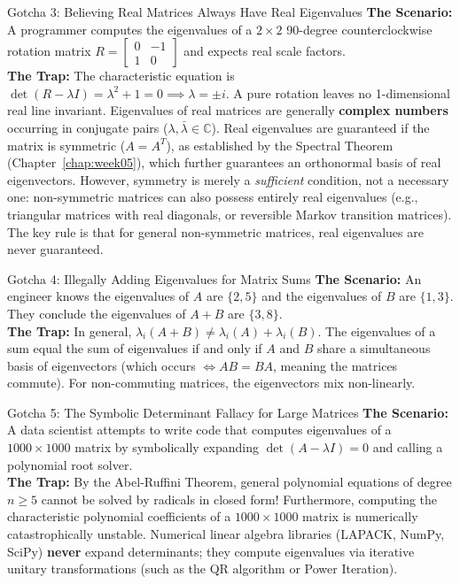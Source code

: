 \begin{trapbox}{Gotcha 3: Believing Real Matrices Always Have Real Eigenvalues}
\textbf{The Scenario:} A programmer computes the eigenvalues of a $2 \times 2$ 90-degree counterclockwise rotation matrix $R = \begin{bmatrix} 0 & -1 \\ 1 & 0 \end{bmatrix}$ and expects real scale factors. \\
\textbf{The Trap:} The characteristic equation is $\det(R - \lambda I) = \lambda^2 + 1 = 0 \implies \lambda = \pm i$. A pure rotation leaves no 1-dimensional real line invariant. Eigenvalues of real matrices are generally \textbf{complex numbers} occurring in conjugate pairs ($\lambda, \bar{\lambda} \in \mathbb{C}$). Real eigenvalues are guaranteed if the matrix is symmetric ($A = A^T$), as established by the Spectral Theorem (Chapter~\ref{chap:week05}), which further guarantees an orthonormal basis of real eigenvectors. However, symmetry is merely a \emph{sufficient} condition, not a necessary one: non-symmetric matrices can also possess entirely real eigenvalues (e.g., triangular matrices with real diagonals, or reversible Markov transition matrices). The key rule is that for general non-symmetric matrices, real eigenvalues are never guaranteed.
\end{trapbox}

\begin{trapbox}{Gotcha 4: Illegally Adding Eigenvalues for Matrix Sums}
\textbf{The Scenario:} An engineer knows the eigenvalues of $A$ are $\{2, 5\}$ and the eigenvalues of $B$ are $\{1, 3\}$. They conclude the eigenvalues of $A + B$ are $\{3, 8\}$. \\
\textbf{The Trap:} In general, $\lambda_i(A + B) \ne \lambda_i(A) + \lambda_i(B)$. The eigenvalues of a sum equal the sum of eigenvalues if and only if $A$ and $B$ share a simultaneous basis of eigenvectors (which occurs $\iff AB = BA$, meaning the matrices commute). For non-commuting matrices, the eigenvectors mix non-linearly.
\end{trapbox}

\begin{trapbox}{Gotcha 5: The Symbolic Determinant Fallacy for Large Matrices}
\textbf{The Scenario:} A data scientist attempts to write code that computes eigenvalues of a $1000 \times 1000$ matrix by symbolically expanding $\det(A - \lambda I) = 0$ and calling a polynomial root solver. \\
\textbf{The Trap:} By the Abel-Ruffini Theorem, general polynomial equations of degree $n \ge 5$ cannot be solved by radicals in closed form! Furthermore, computing the characteristic polynomial coefficients of a $1000 \times 1000$ matrix is numerically catastrophically unstable. Numerical linear algebra libraries (LAPACK, NumPy, SciPy) \textbf{never} expand determinants; they compute eigenvalues via iterative unitary transformations (such as the QR algorithm or Power Iteration).
\end{trapbox}

